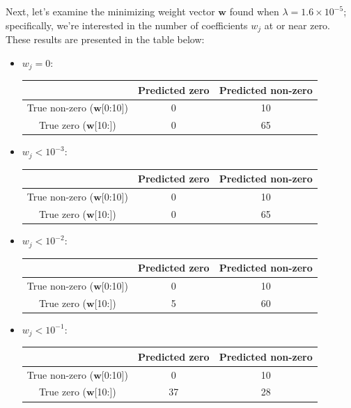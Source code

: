 \documentclass[paper=a4, fontsize=11pt]{scrartcl} %
\numberwithin{equation}{section} %
\numberwithin{figure}{section} %
\numberwithin{table}{section} %
\begin{document}
Next, let's examine the minimizing weight vector $\bm{w}$ found when $\lambda = 1.6 \times 10^{-5}$; specifically, we're interested in the number of coefficients $w_j$ at or near zero. These results are presented in the table below:

\begin{itemize}
\item $w_j = 0$:

\begin{center}
\begin{tabular}{| c | c | c |}
\hline
	& Predicted zero &  Predicted non-zero\\
\hline
True non-zero ($\bm{w}$[0:10]) &  0 &  10 \\
\hline
True zero ($\bm{w}$[10:]) & 0 & 65 \\
\hline
\end{tabular}\end{center}

\item $w_j < 10^{-3}$:

\begin{center}
\begin{tabular}{| c | c | c |}
\hline
	& Predicted zero &  Predicted non-zero\\
\hline
True non-zero ($\bm{w}$[0:10]) &  0 &  10 \\
\hline
True zero ($\bm{w}$[10:]) & 0 & 65 \\
\hline
\end{tabular}\end{center}

\item $w_j < 10^{-2}$:

\begin{center}
\begin{tabular}{| c | c | c |}
\hline
	& Predicted zero &  Predicted non-zero\\
\hline
True non-zero ($\bm{w}$[0:10]) &  0 &  10 \\
\hline
True zero ($\bm{w}$[10:]) & 5 & 60 \\
\hline
\end{tabular}\end{center}

\item $w_j < 10^{-1}$:

\begin{center}
\begin{tabular}{| c | c | c |}
\hline
	& Predicted zero &  Predicted non-zero\\
\hline
True non-zero ($\bm{w}$[0:10]) &  0 &  10 \\
\hline
True zero ($\bm{w}$[10:]) & 37 & 28 \\
\hline
\end{tabular}\end{center}

\end{itemize}
\end{document}
